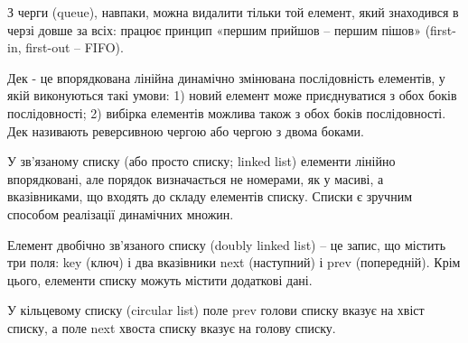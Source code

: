 \documentclass[12pt]{extarticle}
\begin{document}
З черги (queue), навпаки, можна видалити тільки той елемент, який знаходився в черзі довше за всіх: працює принцип «першим прийшов – першим пішов» (first-in, first-out – FIFO).

Дек - це впорядкована лінійна динамічно змінювана послідовність елементів, у якій виконуються такі умови: 1) новий елемент може приєднуватися з обох боків послідовності; 2) вибірка елементів можлива також з обох боків послідовності. Дек називають реверсивною чергою або чергою з двома боками.

У зв’язаному списку (або просто списку; linked list) елементи лінійно впорядковані, але порядок визначається не номерами, як у масиві, а вказівниками, що входять до складу елементів списку. Списки є зручним способом реалізації динамічних множин.

Елемент двобічно зв’язаного списку (doubly linked list) – це запис, що містить три поля: key (ключ) і два вказівники next (наступний) і prev (попередній). Крім цього, елементи списку можуть містити додаткові дані.

У кільцевому списку (circular list) поле prev голови списку вказує на хвіст списку, а поле next хвоста списку вказує на голову списку.

 
\end{document}
